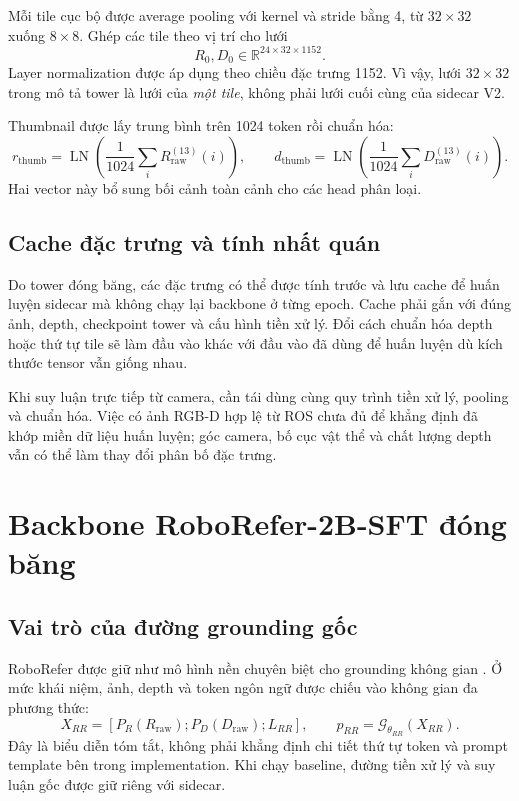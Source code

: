 Mỗi tile cục bộ được average pooling với kernel và stride bằng 4,
từ $32\times32$ xuống $8\times8$. Ghép các tile theo vị trí cho lưới
\begin{equation}
    R_0,D_0\in\mathbb{R}^{24\times32\times1152}.
    \label{eq:method-feature-shape}
\end{equation}
Layer normalization được áp dụng theo chiều đặc trưng 1152.
Vì vậy, lưới $32\times32$ trong mô tả tower là lưới của \emph{một tile},
không phải lưới cuối cùng của sidecar V2.

Thumbnail được lấy trung bình trên 1024 token rồi chuẩn hóa:
\begin{equation}
    r_{\mathrm{thumb}}=
    \operatorname{LN}\left(\frac{1}{1024}
    \sum_i R_{\mathrm{raw}}^{(13)}(i)\right),
    \qquad
    d_{\mathrm{thumb}}=
    \operatorname{LN}\left(\frac{1}{1024}
    \sum_i D_{\mathrm{raw}}^{(13)}(i)\right).
\end{equation}
Hai vector này bổ sung bối cảnh toàn cảnh cho các head phân loại.

\subsection{Cache đặc trưng và tính nhất quán}

Do tower đóng băng, các đặc trưng có thể được tính trước và lưu cache
để huấn luyện sidecar mà không chạy lại backbone ở từng epoch.
Cache phải gắn với đúng ảnh, depth, checkpoint tower và cấu hình
tiền xử lý. Đổi cách chuẩn hóa depth hoặc thứ tự tile sẽ làm đầu vào
khác với đầu vào đã dùng để huấn luyện dù kích thước tensor vẫn giống nhau.

Khi suy luận trực tiếp từ camera, cần tái dùng cùng quy trình tiền xử lý,
pooling và chuẩn hóa. Việc có ảnh RGB-D hợp lệ từ ROS chưa đủ để khẳng
định đã khớp miền dữ liệu huấn luyện; góc camera, bố cục vật thể và
chất lượng depth vẫn có thể làm thay đổi phân bố đặc trưng.

\section{Backbone RoboRefer-2B-SFT đóng băng}
\label{sec:method-backbone}

\subsection{Vai trò của đường grounding gốc}

RoboRefer được giữ như mô hình nền chuyên biệt cho grounding không gian
\cite{zhou2025roborefer}. Ở mức khái niệm, ảnh, depth và token ngôn ngữ
được chiếu vào không gian đa phương thức:
\begin{equation}
    X_{RR}=[P_R(R_{\mathrm{raw}});
    P_D(D_{\mathrm{raw}});L_{RR}],
    \qquad
    p_{RR}=\mathcal{G}_{\theta_{RR}}(X_{RR}).
\end{equation}
Đây là biểu diễn tóm tắt, không phải khẳng định chi tiết thứ tự token
và prompt template bên trong implementation. Khi chạy baseline,
đường tiền xử lý và suy luận gốc được giữ riêng với sidecar.


